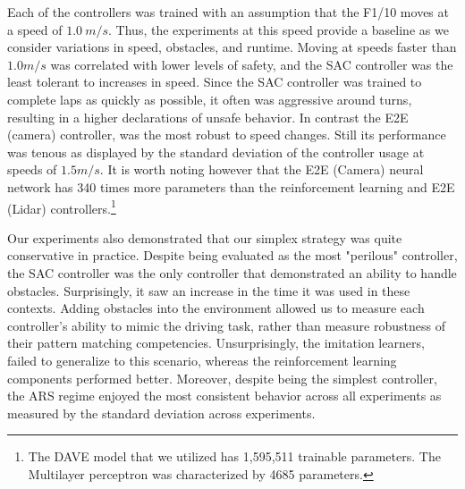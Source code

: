 \documentclass[manuscript,screen,review]{acmart}
\begin{document}



Each of the controllers was trained with an assumption that the F1/10 moves at a speed of $1.0 \ m/s$. Thus, the experiments at this speed provide a baseline as we consider variations in speed, obstacles, and runtime. Moving at speeds faster than $1.0 m/s$ was correlated with lower levels of safety, and the SAC controller was the least tolerant to increases in speed. Since the SAC controller was trained to complete laps as quickly as possible, it often was aggressive around turns, resulting in a higher declarations of unsafe behavior. In contrast the E2E (camera) controller, was the most robust to speed changes. Still its performance was tenous as displayed by the standard deviation of the controller usage at speeds of $1.5 m/s$. It is worth noting however that the E2E (Camera) neural network has 340 times more parameters than the reinforcement learning and E2E (Lidar) controllers.\footnote{The DAVE model that we utilized has 1,595,511 trainable parameters. The Multilayer perceptron was characterized by 4685 parameters.}


Our experiments also demonstrated that our simplex strategy was quite conservative in practice. Despite being evaluated as the most "perilous" controller, the SAC controller was the only controller that demonstrated an ability to handle obstacles. Surprisingly, it saw an increase in the time it was used in these contexts. Adding obstacles into the environment allowed us to measure each controller's ability to mimic the driving task, rather than measure robustness of their pattern matching competencies. Unsurprisingly, the imitation learners, failed to generalize to this scenario, whereas the reinforcement learning components performed better. Moreover, despite being the simplest controller, the ARS regime enjoyed the most consistent behavior across all experiments as measured by the standard deviation across experiments.

\end{document}
